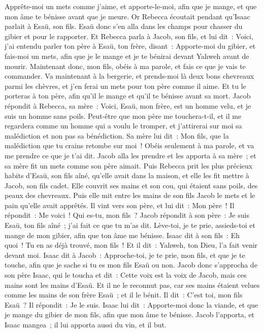 \begin{multicols}{2}
Apprête-moi un mets comme j'aime, et apporte-le-moi, afin que je mange, et que mon âme te bénisse avant que je meure.
Or Rebecca écoutait pendant qu'Isaac parlait à Esaü, son fils. Esaü donc s'en alla dans les champs pour chasser du gibier et pour le rapporter.
Et Rebecca parla à Jacob, son fils, et lui dit~: Voici, j'ai entendu parler ton père à Esaü, ton frère, disant~:
Apporte-moi du gibier, et fais-moi un mets, afin que je le mange et je te bénirai devant Yahweh avant de mourir.
Maintenant donc, mon fils, obéis à ma parole, et fais ce que je vais te commander.
Va maintenant à la bergerie, et prends-moi là deux bons chevreaux parmi les chèvres, et j'en ferai un mets pour ton père comme il aime.
Et tu le porteras à ton père, afin qu'il le mange et qu'il te bénisse avant sa mort.
Jacob répondit à Rebecca, sa mère~: Voici, Esaü, mon frère, est un homme velu, et je suis un homme sans poils.
Peut-être que mon père me touchera-t-il, et il me regardera comme un homme qui a voulu le tromper, et j'attirerai sur moi sa malédiction et non pas sa bénédiction.
Sa mère lui dit~: Mon fils, que la malédiction que tu crains retombe sur moi~! Obéis seulement à ma parole, et va me prendre ce que je t'ai dit.
Jacob alla les prendre et les apporta à sa mère~; et sa mère fit un mets comme son père aimait.
Puis Rebecca prit les plus précieux habits d'Esaü, son fils aîné, qu'elle avait dans la maison, et elle les fit mettre à Jacob, son fils cadet.
Elle couvrit ses mains et son cou, qui étaient sans poils, des peaux des chevreaux.
Puis elle mit entre les mains de son fils Jacob le mets et le pain qu'elle avait apprêtés.
Il vint vers son père, et lui dit~: Mon père~! Il répondit~: Me voici~! Qui es-tu, mon fils~?
Jacob répondit à son père~: Je suis Esaü, ton fils aîné~; j'ai fait ce que tu m'as dit. Lève-toi, je te prie, assieds-toi et mange de mon gibier, afin que ton âme me bénisse.
Isaac dit à son fils~: Eh quoi~! Tu en as déjà trouvé, mon fils~! Et il dit~: Yahweh, ton Dieu, l'a fait venir devant moi.
Isaac dit à Jacob~: Approche-toi, je te prie, mon fils, et que je te touche, afin que je sache si tu es mon fils Esaü ou non.
Jacob donc s'approcha de son père Isaac, qui le toucha et dit~: Cette voix est la voix de Jacob, mais ces mains sont les mains d'Esaü.
Et il ne le reconnut pas, car ses mains étaient velues comme les mains de son frère Esaü~; et il le bénit.
Il dit~: C'est toi, mon fils Esaü~? Il répondit~: Je le suis.
Isaac lui dit~: Apporte-moi donc la viande, et que je mange du gibier de mon fils, afin que mon âme te bénisse. Jacob l'apporta, et Isaac mangea~; il lui apporta aussi du vin, et il but.

\end{multicols}
